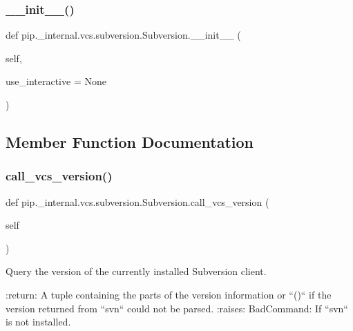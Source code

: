 \subsubsection{\texorpdfstring{\+\_\+\+\_\+init\+\_\+\+\_\+()}{\_\_init\_\_()}}
{\footnotesize\ttfamily def pip.\+\_\+internal.\+vcs.\+subversion.\+Subversion.\+\_\+\+\_\+init\+\_\+\+\_\+ (\begin{DoxyParamCaption}\item[{}]{self,  }\item[{}]{use\+\_\+interactive = {\ttfamily None} }\end{DoxyParamCaption})}



\subsection{Member Function Documentation}
\mbox{\label{classpip_1_1__internal_1_1vcs_1_1subversion_1_1Subversion_a28eb0ea686f7fdfb26b3672e0d936be5}} 
\subsubsection{\texorpdfstring{call\+\_\+vcs\+\_\+version()}{call\_vcs\_version()}}
{\footnotesize\ttfamily def pip.\+\_\+internal.\+vcs.\+subversion.\+Subversion.\+call\+\_\+vcs\+\_\+version (\begin{DoxyParamCaption}\item[{}]{self }\end{DoxyParamCaption})}

\begin{DoxyVerb}Query the version of the currently installed Subversion client.

:return: A tuple containing the parts of the version information or
    ``()`` if the version returned from ``svn`` could not be parsed.
:raises: BadCommand: If ``svn`` is not installed.
\end{DoxyVerb}
 \mbox{\label{classpip_1_1__internal_1_1vcs_1_1subversion_1_1Subversion_a994fcc3f75133b0a74c8774b242069bb}} 
